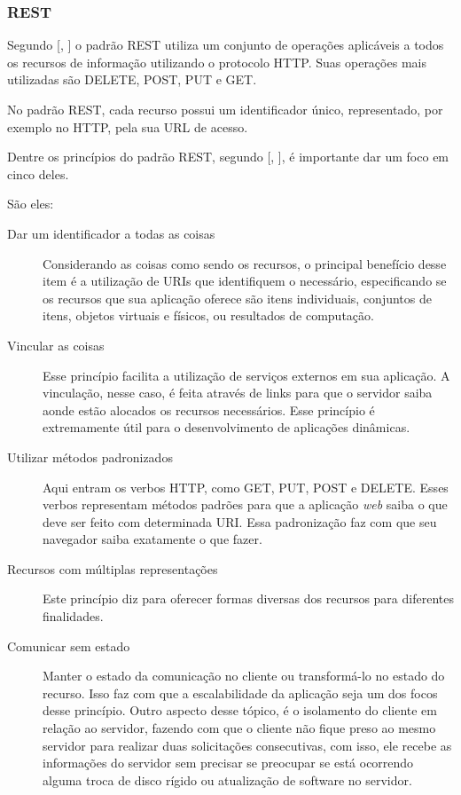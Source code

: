 \documentclass[
	12pt,				%
	oneside,			%
	a4paper,			%
	brazil				%
]{abntex2}
\newcommand{\citecustom}[1]{[\citeauthoronline{#1}, \citeyear{#1}]}
\begin{document}
\subsubsection{REST}

Segundo \citecustom{Almeida2016} o padrão REST utiliza um conjunto de operações aplicáveis a todos os recursos de informação utilizando o protocolo HTTP. Suas operações mais utilizadas são DELETE, POST, PUT e GET.

No padrão REST, cada recurso possui um identificador único, representado, por exemplo no HTTP, pela sua URL de acesso.

Dentre os princípios do padrão REST, segundo \citecustom{Gomes2009}, é importante dar um foco em cinco deles.

São eles: 

\begin{description}

\item[Dar um identificador a todas as coisas]

Considerando as coisas como sendo os recursos, o principal benefício desse item é a utilização de URIs que identifiquem o necessário, especificando se os recursos que sua aplicação oferece são itens individuais, conjuntos de itens, objetos virtuais e físicos, ou resultados de computação.  

\item[Vincular as coisas]

Esse princípio facilita a utilização de serviços externos em sua aplicação. A vinculação, nesse caso, é feita através de links para que o servidor saiba aonde estão alocados os recursos necessários. Esse princípio é extremamente útil para o desenvolvimento de aplicações dinâmicas.

\item[Utilizar métodos padronizados]

Aqui entram os verbos HTTP, como GET, PUT, POST e DELETE. Esses verbos representam métodos padrões para que a aplicação \textit{web} saiba o que deve ser feito com determinada URI. Essa padronização faz com que seu navegador saiba exatamente o que fazer.

\item[Recursos com múltiplas representações]

Este princípio diz para oferecer formas diversas dos recursos para diferentes finalidades. 	

\item[Comunicar sem estado]

Manter o estado da comunicação no cliente ou transformá-lo no estado do recurso. Isso faz com que a escalabilidade da aplicação seja um dos focos desse princípio. Outro aspecto desse tópico, é o isolamento do cliente em relação ao servidor, fazendo com que o cliente não fique preso ao mesmo servidor para realizar duas solicitações consecutivas, com isso, ele recebe as informações do servidor sem precisar se preocupar se está ocorrendo alguma troca de disco rígido ou atualização de software no servidor.

\end{description} 
\end{document}
